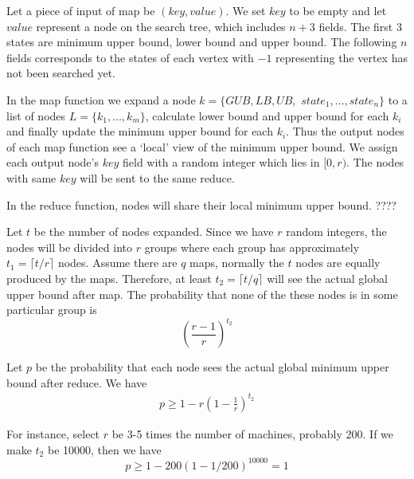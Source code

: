     Let a piece of input of map be $(key, value)$. We set $key$ to be empty and let $value$ represent a node on the search tree, which includes $n+3$ fields. The first $3$ states are minimum upper bound, lower bound and upper bound. The following $n$ fields corresponds to the states of each vertex with $-1$ representing the vertex has not been searched yet.

    In the map function we expand a node $k=\{GUB, LB, UB,$ $state_1, \dots, state_n\}$ to a list of nodes $L=\{k_1, \dots, k_m\}$, calculate lower bound and upper bound for each $k_i$ and finally update the minimum upper bound for each $k_i$. Thus the output nodes of each map function see a `local' view of the minimum upper bound. We assign each output node's $key$ field with a random integer which lies in $[0, r)$. The nodes with same $key$ will be sent to the same reduce.

    In the reduce function, nodes will share their local minimum upper bound. {\color{red}????}

    Let $t$ be the number of nodes expanded. Since we have $r$ random integers, the nodes will be divided into $r$ groups where each group has approximately $t_1=\lceil t/r \rceil$ nodes. Assume there are $q$ maps, normally the $t$ nodes are equally produced by the maps. Therefore, at least $t_2=\lceil t/q \rceil$ will see the actual global upper bound after map. The probability that none of the these nodes is in some particular group is
    \[
        \left(\frac{r-1}{r}\right)^{t_2}
    \]

    Let $p$ be the probability that each node sees the actual global minimum upper bound after reduce. We have
    \begin{align*}
        p \geq 1-r\left(1-\frac{1}{r}\right)^{t_2}
    \end{align*}

    For instance, select $r$ be 3-5 times the number of machines, probably 200. If we make $t_2$ be 10000, then we have
    \[p\geq 1-200(1-1/200)^{10000}=1\]
\newpage 